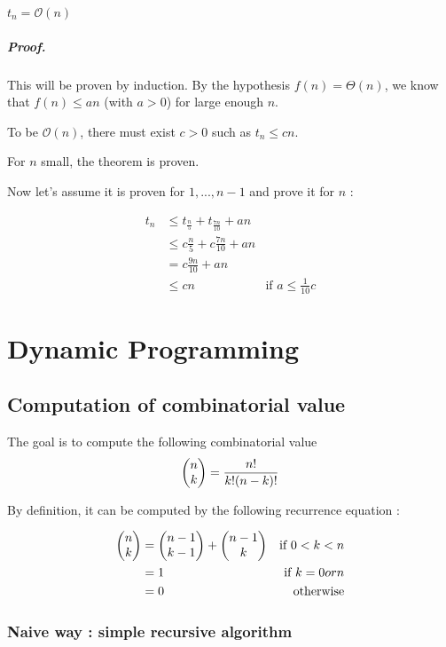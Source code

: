 \begin{theorem}
$t_n = \mathcal{O} (n)$
\end{theorem}

\paragraph*{Proof.}This will be proven by induction. By the hypothesis $f(n) = \Theta (n)$, we know that $f(n) \leq an$ (with $a>0$) for large enough $n$.

To be $\mathcal{O}(n)$, there must exist $c>0$ such as $t_n \leq cn$.

For $n$ small, the theorem is proven.

Now let's assume it is proven for $1,...,n-1$ and prove it for $n$ :

\begin{align*}
t_n &\leq t_{\frac{n}{5}} + t_{\frac{7n}{10}} + an\\
&\leq c \frac{n}{5} + c \frac{7n}{10} + an \\
&= c \frac{9n}{10} + an\\
&\leq cn &\text{if } a\leq \frac{1}{10}c
\end{align*}



\chapter{Dynamic Programming}

    \section{Computation of combinatorial value}



The goal is to compute the following combinatorial value  $$\left( \begin{matrix} n\\ k\end{matrix} \right) = \frac{n!}{k!(n-k)!}$$

By definition, it can be computed by the following recurrence equation :

\begin{align*}
\left( \begin{matrix} n\\ k\end{matrix} \right) &= \left( \begin{matrix} n-1\\ k-1\end{matrix} \right) + \left( \begin{matrix} n-1\\ k\end{matrix} \right) & \text{if } 0 < k<n\\
&=1 & \text{if } k=0 or n\\
&=0 & \text{otherwise}
\end{align*}

        
        
        \subsection{Naive way : simple recursive algorithm}



